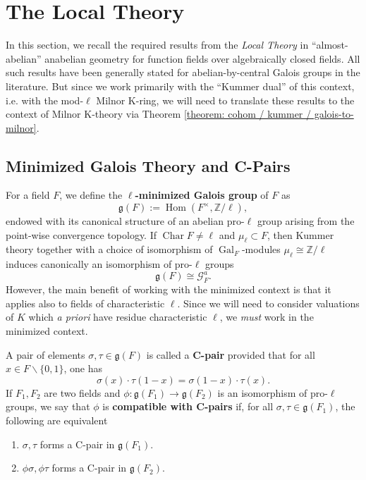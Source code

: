 \documentclass[11pt]{amsart}
\theoremstyle{definition}
\theoremstyle{remark}
\numberwithin{equation}{section}
\DeclareMathOperator{\Gal}{Gal}
\DeclareMathOperator{\Char}{Char}
\DeclareMathOperator{\Hom}{Hom}
\newcommand{\Z}{\mathbb{Z}}
\newcommand{\Gc}{\mathcal{G}}
\newcommand{\gfrak}{\mathfrak{g}}
\begin{document}
\section{The Local Theory}
\label{section: localthy}


In this section, we recall the required results from the \emph{Local Theory} in ``almost-abelian'' anabelian geometry for function fields over algebraically closed fields.
All such results have been generally stated for abelian-by-central Galois groups in the literature.
But since we work primarily with the ``Kummer dual'' of this context, i.e. with the mod-$\ell$ Milnor K-ring, we will need to translate these results to the context of Milnor K-theory via Theorem \ref{theorem: cohom / kummer / galois-to-milnor}.

\subsection{Minimized Galois Theory and C-Pairs}
\label{subsection: localthy / c-pairs}

For a field $F$, we define the {\bf $\ell$-minimized Galois group} of $F$ as
\[ \gfrak(F) := \Hom(F^\times,\Z/\ell), \]
endowed with its canonical structure of an abelian pro-$\ell$ group arising from the point-wise convergence topology.
If $\Char F \neq \ell$ and $\mu_\ell \subset F$, then Kummer theory together with a choice of isomorphism of $\Gal_F$-modules $\mu_\ell \cong \Z/\ell$ induces canonically an isomorphism of pro-$\ell$ groups
\[ \gfrak(F) \cong \Gc_F^a. \]
However, the main benefit of working with the minimized context is that it applies also to fields of characteristic $\ell$.
Since we will need to consider valuations of $K$ which \emph{a priori} have residue characteristic $\ell$, we \emph{must} work in the minimized context.

A pair of elements $\sigma,\tau \in \gfrak(F)$ is called a {\bf C-pair} provided that for all $x \in F \smallsetminus \{0,1\}$, one has
\[ \sigma(x)\cdot\tau(1-x) = \sigma(1-x)\cdot\tau(x). \]
If $F_1,F_2$ are two fields and $\phi : \gfrak(F_1) \rightarrow \gfrak(F_2)$ is an isomorphism of pro-$\ell$ groups, we say that $\phi$ is {\bf compatible with C-pairs} if, for all $\sigma,\tau \in \gfrak(F_1)$, the following are equivalent
\begin{enumerate}
  \item $\sigma,\tau$ forms a C-pair in $\gfrak(F_1)$.
  \item $\phi\sigma,\phi\tau$ forms a C-pair in $\gfrak(F_2)$.
\end{enumerate}
\end{document}
